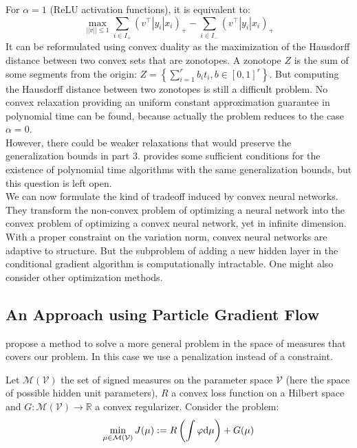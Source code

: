\documentclass[a4paper, 11pt]{scrartcl}
\begin{document}
{For $\alpha = 1$ (ReLU activation functions), it is equivalent to:
\begin{equation}
\max_{||v|| \leq 1} \sum_{i\in I_+} (v^\top |y_i| x_i )_+  - \sum_{i\in I_-} (v^\top |y_i| x_i )_+
\end{equation}
It can be reformulated using convex duality as the maximization of the Hausdorff distance between two convex sets that are zonotopes. A zonotope $Z$ is the sum of some segments from the origin: $Z = \left\{ \sum_{i=1}^r b_i t_i, b \in [0, 1]^r \right\}$. But computing the Hausdorff distance between two zonotopes is still a difficult problem. No convex relaxation providing an uniform constant approximation guarantee in polynomial time can be found, because actually the problem reduces to the case $\alpha = 0$.\\

However, there could be weaker relaxations that would preserve the generalization bounds in part 3. \cite{bach2017breaking} provides some sufficient conditions for the existence of polynomial time algorithms with the same generalization bounds, but this question is left open.\\

We can now formulate the kind of tradeoff induced by convex neural networks. They transform the non-convex problem of optimizing a neural network into the convex problem of optimizing a convex neural network, yet in infinite dimension. With a proper constraint on the variation norm, convex neural networks are adaptive to structure. But the subproblem of adding a new hidden layer in the conditional gradient algorithm is computationally intractable. One might also consider other optimization methods.


\subsection{An Approach using Particle Gradient Flow}

\cite{chizat2018global} propose a method to solve a more general problem in the space of measures that covers our problem. In this case we use a penalization instead of a constraint.

Let $\mathcal{M}(\mathcal{V})$ the set of signed measures on the parameter space $\mathcal{V}$ (here the space of possible hidden unit parameters), $R$ a convex loss function on a Hilbert space and $G:\mathcal{M}(\mathcal{V}) \rightarrow \mathbb{R}$ a convex regularizer. Consider the problem:
\begin{equation}
\min_{\mu \in \mathcal{M}(\mathcal{V})} J(\mu):=R\left( \int \varphi \textnormal{d}\mu \right) + G(\mu)
\end{equation}

}
\end{document}
